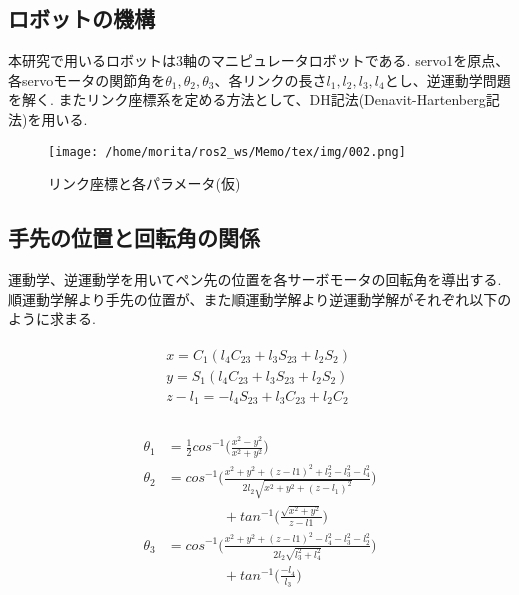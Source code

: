 \documentclass[10pt]{jarticle}
\begin{document}
	\subsection{ロボットの機構}
	本研究で用いるロボットは3軸のマニピュレータロボットである.
	servo1を原点、各servoモータの関節角を$\theta_1, \theta_2, \theta_3$、各リンクの長さ$l_1, l_2, l_3, l_4$とし、逆運動学問題を解く.
	またリンク座標系を定める方法として、DH記法(Denavit-Hartenberg記法)を用いる.

    \begin{center}
        \begin{figure}[h]
            \texttt{[image: /home/morita/ros2\_ws/Memo/tex/img/002.png]}
            \caption{リンク座標と各パラメータ(仮)}
            \label{manipulator}
        \end{figure}
    \end{center}
    
	\subsection{手先の位置と回転角の関係}
	
	運動学、逆運動学を用いてペン先の位置を各サーボモータの回転角を導出する.
	順運動学解より手先の位置が、また順運動学解より逆運動学解がそれぞれ以下のように求まる.
	
	\scriptsize
	\begin{equation}
		\begin{array}{c}
			\begin{split}
				&  x  =  C_1(l_4C_{23}  +  l_3S_{23}  +  l_2S_2)\quad \\
				&  y  =  S_1(l_4C_{23}  +  l_3S_{23}  +  l_2S_2)\quad \\
				&  z  -  l_1  =  -l_4S_{23}  +  l_3C_{23}  +  l_2C_2\quad \\
			\end{split}
		\end{array}
	\end{equation}

	\begin{equation}
		\begin{array}{c}
			\begin{split}
				\theta_1  &  =\frac{1}{2}  cos^{-1}\biggl( \frac{x^2-y^2}{x^2+y^2} \biggr) \\
				\theta_2  &  = cos^{-1}\biggl( \frac{x^2+y^2+(z-l1)^2  +  l_2^2-l_3^2-l_4^2}{2l_2\sqrt{x^2+y^2+(z-l_1)^2}} \biggr)\\
				&\qquad\qquad  +  tan^{-1}\biggl( \frac{\sqrt{x^2+y^2}}{z-l1}\biggr) \\
				\theta_3  &  =cos^{-1}\biggl( \frac{x^2+y^2+(z-l1)^2 - l_4^2-l_3^2-l_2^2}{2l_2\sqrt{l_3^2+l_4^2}}\biggr)\\
				&\qquad\qquad + tan^{-1}\biggl( \frac{-l_4}{l_3}\biggr)\\
			\end{split}
		\end{array}
	\end{equation}
	
\end{document}
